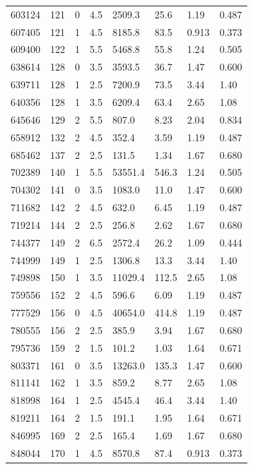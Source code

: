 \documentclass[preview]{standalone}
\begin{document}
{{{\begin{tabular}{L{1.2cm}C{1.2cm} C{0.3cm}C{0.5cm} C{1.4cm}C{1.4cm} C{1.4cm}C{1.4cm}}
  603124  &   121  & 0     & 4.5 &  2509.3  & 25.6  & 1.19 &  0.487   \\ 
  607405  &   121  & 1     & 4.5 &  8185.8  & 83.5  & 0.913 &  0.373   \\ 
  609400  &   122  & 1     & 5.5 &  5468.8  & 55.8  & 1.24 &  0.505   \\ 
  638614  &   128  & 0     & 3.5 &  3593.5  & 36.7  & 1.47 &  0.600   \\ 
  639711  &   128  & 1     & 2.5 &  7200.9  & 73.5  & 3.44 &  1.40   \\ 
  640356  &   128  & 1     & 3.5 &  6209.4  & 63.4  & 2.65 &  1.08   \\ 
  645646  &   129  & 2     & 5.5 &  807.0  & 8.23  & 2.04 &  0.834   \\ 
  658912  &   132  & 2     & 4.5 &  352.4  & 3.59  & 1.19 &  0.487   \\ 
  685462  &   137  & 2     & 2.5 &  131.5  & 1.34  & 1.67 &  0.680   \\ 
  702389  &   140  & 1     & 5.5 &  53551.4  & 546.3  & 1.24 &  0.505   \\ 
  704302  &   141  & 0     & 3.5 &  1083.0  & 11.0  & 1.47 &  0.600   \\ 
  711682  &   142  & 2     & 4.5 &  632.0  & 6.45  & 1.19 &  0.487   \\ 
  719214  &   144  & 2     & 2.5 &  256.8  & 2.62  & 1.67 &  0.680   \\ 
  744377  &   149  & 2     & 6.5 &  2572.4  & 26.2  & 1.09 &  0.444   \\ 
  744999  &   149  & 1     & 2.5 &  1306.8  & 13.3  & 3.44 &  1.40   \\ 
  749898  &   150  & 1     & 3.5 &  11029.4  & 112.5  & 2.65 &  1.08   \\ 
  759556  &   152  & 2     & 4.5 &  596.6  & 6.09  & 1.19 &  0.487   \\ 
  777529  &   156  & 0     & 4.5 &  40654.0  & 414.8  & 1.19 &  0.487   \\ 
  780555  &   156  & 2     & 2.5 &  385.9  & 3.94  & 1.67 &  0.680   \\ 
  795736  &   159  & 2     & 1.5 &  101.2  & 1.03  & 1.64 &  0.671   \\ 
  803371  &   161  & 0     & 3.5 &  13263.0  & 135.3  & 1.47 &  0.600   \\ 
  811141  &   162  & 1     & 3.5 &  859.2  & 8.77  & 2.65 &  1.08   \\ 
  818998  &   164  & 1     & 2.5 &  4545.4  & 46.4  & 3.44 &  1.40   \\ 
  819211  &   164  & 2     & 1.5 &  191.1  & 1.95  & 1.64 &  0.671   \\ 
  846995  &   169  & 2     & 2.5 &  165.4  & 1.69  & 1.67 &  0.680   \\ 
  848044  &   170  & 1     & 4.5 &  8570.8  & 87.4  & 0.913 &  0.373   \\ 
\hline 
\end{tabular} 

}}}
\end{document}
